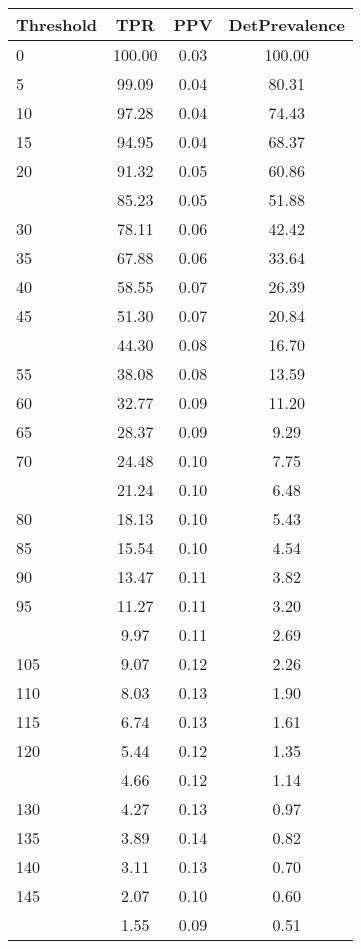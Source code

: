 \begin{table}[ht]
\centering
\begin{tabular}{lccc}
  \toprule
Threshold & TPR & PPV & DetPrevalence \\ 
  \midrule
0 & 100.00 & 0.03 & 100.00 \\ 
  5 & 99.09 & 0.04 & 80.31 \\ 
  10 & 97.28 & 0.04 & 74.43 \\ 
  15 & 94.95 & 0.04 & 68.37 \\ 
  20 & 91.32 & 0.05 & 60.86 \\ 
   \addlinespace
25 & 85.23 & 0.05 & 51.88 \\ 
  30 & 78.11 & 0.06 & 42.42 \\ 
  35 & 67.88 & 0.06 & 33.64 \\ 
  40 & 58.55 & 0.07 & 26.39 \\ 
  45 & 51.30 & 0.07 & 20.84 \\ 
   \addlinespace
50 & 44.30 & 0.08 & 16.70 \\ 
  55 & 38.08 & 0.08 & 13.59 \\ 
  60 & 32.77 & 0.09 & 11.20 \\ 
  65 & 28.37 & 0.09 & 9.29 \\ 
  70 & 24.48 & 0.10 & 7.75 \\ 
   \addlinespace
75 & 21.24 & 0.10 & 6.48 \\ 
  80 & 18.13 & 0.10 & 5.43 \\ 
  85 & 15.54 & 0.10 & 4.54 \\ 
  90 & 13.47 & 0.11 & 3.82 \\ 
  95 & 11.27 & 0.11 & 3.20 \\ 
   \addlinespace
100 & 9.97 & 0.11 & 2.69 \\ 
  105 & 9.07 & 0.12 & 2.26 \\ 
  110 & 8.03 & 0.13 & 1.90 \\ 
  115 & 6.74 & 0.13 & 1.61 \\ 
  120 & 5.44 & 0.12 & 1.35 \\ 
   \addlinespace
125 & 4.66 & 0.12 & 1.14 \\ 
  130 & 4.27 & 0.13 & 0.97 \\ 
  135 & 3.89 & 0.14 & 0.82 \\ 
  140 & 3.11 & 0.13 & 0.70 \\ 
  145 & 2.07 & 0.10 & 0.60 \\ 
   \addlinespace
150 & 1.55 & 0.09 & 0.51 \\ 

\end{tabular}
\end{table}

